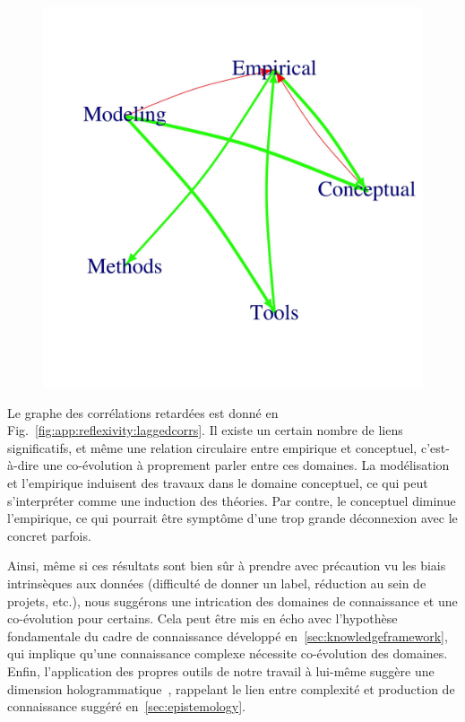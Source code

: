 \begin{figure}
	\includegraphics[width=\linewidth]{Figures/Final/F-reflexivity-laggedcorrs.jpg}
\end{figure}


Le graphe des corrélations retardées est donné en Fig.~\ref{fig:app:reflexivity:laggedcorrs}. Il existe un certain nombre de liens significatifs, et même une relation circulaire entre empirique et conceptuel, c'est-à-dire une co-évolution à proprement parler entre ces domaines. La modélisation et l'empirique induisent des travaux dans le domaine conceptuel, ce qui peut s'interpréter comme une induction des théories. Par contre, le conceptuel diminue l'empirique, ce qui pourrait être symptôme d'une trop grande déconnexion avec le concret parfois.

Ainsi, même si ces résultats sont bien sûr à prendre avec précaution vu les biais intrinsèques aux données (difficulté de donner un label, réduction au sein de projets, etc.), nous suggérons une intrication des domaines de connaissance et une co-évolution pour certains. Cela peut être mis en écho avec l'hypothèse fondamentale du cadre de connaissance développé en~\ref{sec:knowledgeframework}, qui implique qu'une connaissance complexe nécessite co-évolution des domaines. Enfin, l'application des propres outils de notre travail à lui-même suggère une dimension hologrammatique~\cite{morin1986methode}, rappelant le lien entre complexité et production de connaissance suggéré en~\ref{sec:epistemology}. 



